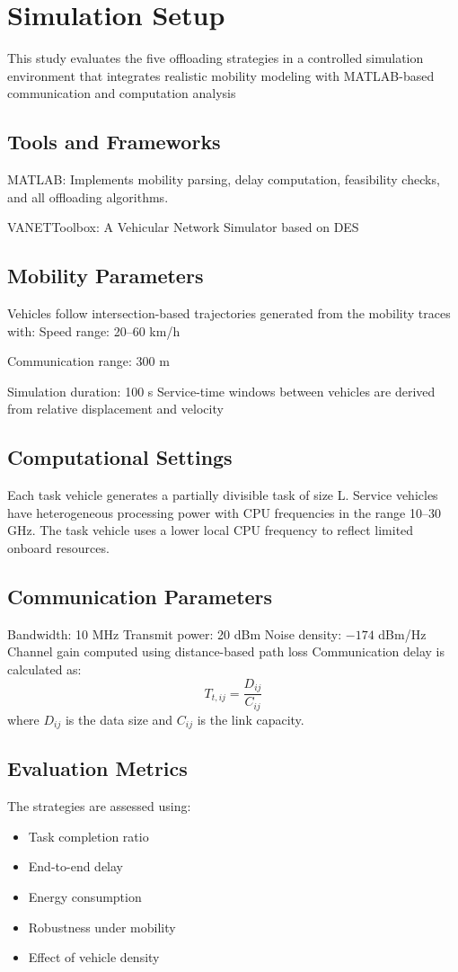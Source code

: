 \documentclass[conference]{IEEEtran}
\begin{document}
\section{Simulation Setup}
This study evaluates the five offloading strategies in a controlled simulation environment that integrates realistic mobility modeling with MATLAB-based communication and computation analysis

\subsection{Tools and Frameworks}
MATLAB: Implements mobility parsing, delay computation, feasibility checks, and all offloading algorithms.

VANETToolbox: A Vehicular Network Simulator based on DES

\subsection{Mobility Parameters}
Vehicles follow intersection-based trajectories generated from the mobility traces with:
Speed range: 20–60 km/h

Communication range: 300 m

Simulation duration: 100 s
Service-time windows between vehicles are derived from relative displacement and velocity

\subsection{ Computational Settings}
Each task vehicle generates a partially divisible task of size L.
Service vehicles have heterogeneous processing power with CPU frequencies in the range 10–30 GHz.
The task vehicle uses a lower local CPU frequency to reflect limited onboard resources.
\subsection{Communication Parameters}
Bandwidth: 10 MHz
Transmit power: 20 dBm
Noise density: $-174$ dBm/Hz
Channel gain computed using distance-based path loss
Communication delay is calculated as:
\begin{equation}
    T_{t,ij} = \frac{D_{ij}}{C_{ij}}
\end{equation}
where $D_{ij}$ is the data size and $C_{ij}$ is the link capacity.

\subsection{Evaluation Metrics}
The strategies are assessed using:
\begin{itemize}
    \item Task completion ratio
    \item End-to-end delay
    \item Energy consumption
    \item Robustness under mobility
    \item Effect of vehicle density
\end{itemize}
\end{document}
